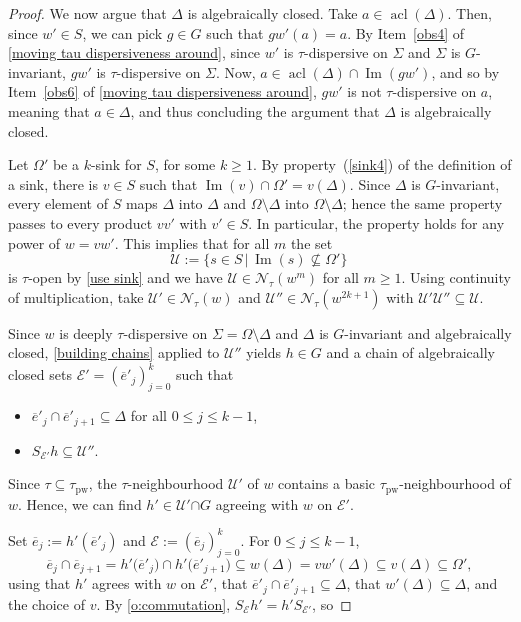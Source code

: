 \documentclass{article}
\theoremstyle{remark}
\theoremstyle{definition}
\DeclareMathOperator{\acl}{acl}
\newcommand{\U}[0]{\mathbb{U}}
\newcommand{\nn}[0]{S}%
\renewcommand{\U}[0]{\mathcal{U}}
\DeclareMathOperator{\im}{Im}
\newcommand{\pw}[0]{\tau_{\mathrm{pw}}}
\newcommand{\E}[0]{\mathcal{E}}
\renewcommand\leq{\leqslant}
\renewcommand\geq{\geqslant}
\begin{document}
{{{{{\begin{proof}
{We now argue that $\Delta$ is algebraically closed. Take $a\in\acl(\Delta)$. Then, since $w'\in S$, we can pick $g\in G$ such that $gw'(a)=a$.  By Item~\eqref{obs4} of \cref{moving tau dispersiveness around}, since $w'$ is $\tau$-dispersive on $\Sigma$ and $\Sigma$ is $G$-invariant, $g w'$ is $\tau$-dispersive on $\Sigma$. Now, $a\in \acl(\Delta)\cap \im(g w')$, and so by Item~\eqref{obs6} of \cref{moving tau dispersiveness around}, $g w'$ is not $\tau$-dispersive on $a$, meaning that $a\in\Delta$, and thus concluding the argument that $\Delta$ is algebraically closed.}



     
     
     Let $\Omega'$ be a $k$-sink for $S$, for some {$k\geq 1$.}
     By property~(\ref{sink4}) of the definition of a sink, there is $v\in S$ such that $\im(v)\cap\Omega'=v(\Delta)$.
   {   Since $\Delta$ is $G$-invariant, every
  element of $S$ maps $\Delta$ into $\Delta$ and $\Omega \setminus \Delta$
  into $\Omega \setminus \Delta$; hence the same property passes to every
  product $v v'$ with $v' \in S$.}
     In particular, the property holds for any power of $w=vw'$. This implies that for all $m$ the set 
     {    \begin{equation*}
  	\U:=\{s\in S\,|\,\im(s)\nsubseteq \Omega'\}\, 
  \end{equation*}}
{is $\tau$-open by \cref{use sink} and  we have
  $\U \in \mathcal{N}_\tau(w^m)$ for all $m \geq 1$. Using continuity of
  multiplication, take $\U' \in \mathcal{N}_\tau(w)$ and
  $\U'' \in \mathcal{N}_\tau(w^{2k+1})$ with $\U' \U'' \subseteq \U$.}
     

     { Since $w$ is deeply $\tau$-dispersive on $\Sigma = \Omega \setminus \Delta$
  and $\Delta$ is $G$-invariant and algebraically closed,
  \cref{building chains} applied to $\U''$ yields $h \in G$ and a chain of
  algebraically closed sets $\E' = (\overline{e}'_j)_{j=0}^{k}$ such that}
   \begin{itemize}
     	\item $\overline{e}'_{j}\cap \overline{e}'_{j+1}\subseteq\Delta$ for all $0\leq j\leq k-1$,
     	\item $\nn_{\E'}h\subseteq\U''$. 
     \end{itemize}
      Since %
      $\tau\subseteq\pw$, the $\tau$-neighbourhood $\U'$ of $w$ contains a  basic $\pw$-neighbourhood of $w$. Hence,
      we can find $h'\in\U'{\cap G}$ agreeing with $w$ on $\E'$. 
      
{Set  $\overline{e}_j := h'(\overline{e}'_j)$ and
  $\E := (\overline{e}_j)_{j=0}^{k}$. For $0 \leq j \leq k-1$,
  \[
    \overline{e}_j \cap \overline{e}_{j+1}
      = h'\bigl(\overline{e}'_j\bigr) \cap h'\bigl(\overline{e}'_{j+1}\bigr)
            \subseteq w(\Delta) = v w'(\Delta) \subseteq v(\Delta) \subseteq \Omega',
  \]
  using that $h'$ agrees with $w$ on $\E'$, that
  $\overline{e}'_j \cap \overline{e}'_{j+1} \subseteq \Delta$, that
  $w'(\Delta) \subseteq \Delta$, and the choice of $v$.   }   %
   { By \cref{o:commutation}, $\nn_{\E} h' = h' \nn_{\E'}$, so}
 

\end{proof}}}}}}
\end{document}
